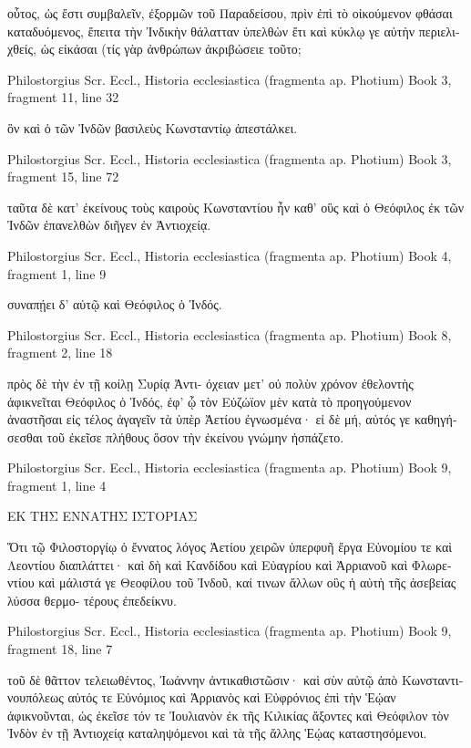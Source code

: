 \documentclass[12pt,letterpaper,twoside,final]{memoir}
\begin{document}
\begin{greek}
                                                                       οὗτος, 
ὡς ἔστι συμβαλεῖν, ἐξορμῶν τοῦ Παραδείσου, πρὶν ἐπὶ τὸ οἰκούμενον 
φθάσαι καταδυόμενος, ἔπειτα τὴν Ἰνδικὴν θάλατταν ὑπελθὼν ἔτι 
καὶ κύκλῳ γε αὐτὴν περιελιχθείς, ὡς εἰκάσαι (τίς γὰρ ἀνθρώπων 
ἀκριβώσειε τοῦτο; 



Philostorgius Scr. Eccl., Historia ecclesiastica (fragmenta ap. Photium) 
Book 3, fragment 11, line 32

                                     ὃν καὶ ὁ τῶν Ἰνδῶν βασιλεὺς 
Κωνσταντίῳ ἀπεστάλκει. 



Philostorgius Scr. Eccl., Historia ecclesiastica (fragmenta ap. Photium) 
Book 3, fragment 15, line 72

                                                            ταῦτα δὲ κατ' 
ἐκείνους τοὺς καιροὺς Κωνσταντίου ἦν καθ' οὓς καὶ ὁ Θεόφιλος ἐκ 
τῶν Ἰνδῶν ἐπανελθὼν διῆγεν ἐν Ἀντιοχείᾳ. 



Philostorgius Scr. Eccl., Historia ecclesiastica (fragmenta ap. Photium) 
Book 4, fragment 1, line 9

          συναπῄει δ' αὐτῷ καὶ Θεόφιλος ὁ Ἰνδός. 



Philostorgius Scr. Eccl., Historia ecclesiastica (fragmenta ap. Photium) 
Book 8, fragment 2, line 18

                                        πρὸς δὲ τὴν ἐν τῇ κοίλῃ Συρίᾳ Ἀντι-
όχειαν μετ' οὐ πολὺν χρόνον ἐθελοντὴς ἀφικνεῖται Θεόφιλος ὁ Ἰνδός, 
ἐφ' ᾧ τὸν Εὐζώϊον μὲν κατὰ τὸ προηγούμενον ἀναστῆσαι εἰς τέλος 
ἀγαγεῖν τὰ ὑπὲρ Ἀετίου ἐγνωσμένα· εἰ δὲ μή, αὐτός γε καθηγήσεσθαι 
τοῦ ἐκεῖσε πλήθους ὅσον τὴν ἐκείνου γνώμην ἠσπάζετο. 



Philostorgius Scr. Eccl., Historia ecclesiastica (fragmenta ap. Photium) 
Book 9, fragment 1, line 4

ΕΚ ΤΗΣ ΕΝΝΑΤΗΣ ΙΣΤΟΡΙΑΣ


 Ὅτι τῷ Φιλοστοργίῳ ὁ ἔννατος λόγος Ἀετίου χειρῶν ὑπερφυῆ 
ἔργα Εὐνομίου τε καὶ Λεοντίου διαπλάττει· καὶ δὴ καὶ Κανδίδου καὶ 
Εὐαγρίου καὶ Ἀρριανοῦ καὶ Φλωρεντίου καὶ μάλιστά γε Θεοφίλου 
τοῦ Ἰνδοῦ, καί τινων ἄλλων οὓς ἡ αὐτὴ τῆς ἀσεβείας λύσσα θερμο-
τέρους ἐπεδείκνυ. 



Philostorgius Scr. Eccl., Historia ecclesiastica (fragmenta ap. Photium) 
Book 9, fragment 18, line 7

                             τοῦ δὲ θᾶττον τελειωθέντος, Ἰωάννην 
ἀντικαθιστῶσιν· καὶ σὺν αὐτῷ ἀπὸ Κωνσταντινουπόλεως αὐτός τε 
Εὐνόμιος καὶ Ἀρριανὸς καὶ Εὐφρόνιος ἐπὶ τὴν Ἑῴαν ἀφικνοῦνται, 
ὡς ἐκεῖσε τόν τε Ἰουλιανὸν ἐκ τῆς Κιλικίας ἄξοντες καὶ Θεόφιλον 
τὸν Ἰνδὸν ἐν τῇ Ἀντιοχείᾳ καταληψόμενοι καὶ τὰ τῆς ἄλλης Ἑῴας 
καταστησόμενοι. 

\end{greek}
\end{document}
